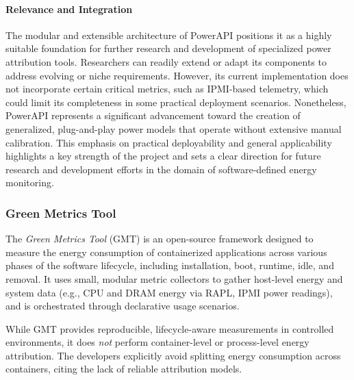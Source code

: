 \paragraph{Relevance and Integration}
The modular and extensible architecture of PowerAPI positions it as a highly suitable foundation for further research and development of specialized power attribution tools. Researchers can readily extend or adapt its components to address evolving or niche requirements. However, its current implementation does not incorporate certain critical metrics, such as IPMI-based telemetry, which could limit its completeness in some practical deployment scenarios. Nonetheless, PowerAPI represents a significant advancement toward the creation of generalized, plug-and-play power models that operate without extensive manual calibration. This emphasis on practical deployability and general applicability highlights a key strength of the project and sets a clear direction for future research and development efforts in the domain of software-defined energy monitoring.

\subsubsection{Green Metrics Tool}

The \textit{Green Metrics Tool} (GMT)\parencite{greencodingdocs} is an open-source framework designed to measure the energy consumption of containerized applications across various phases of the software lifecycle, including installation, boot, runtime, idle, and removal. It uses small, modular metric collectors to gather host-level energy and system data (e.g., CPU and DRAM energy via RAPL, IPMI power readings), and is orchestrated through declarative usage scenarios.

While GMT provides reproducible, lifecycle-aware measurements in controlled environments, it does \textit{not} perform container-level or process-level energy attribution. The developers explicitly avoid splitting energy consumption across containers, citing the lack of reliable attribution models.

